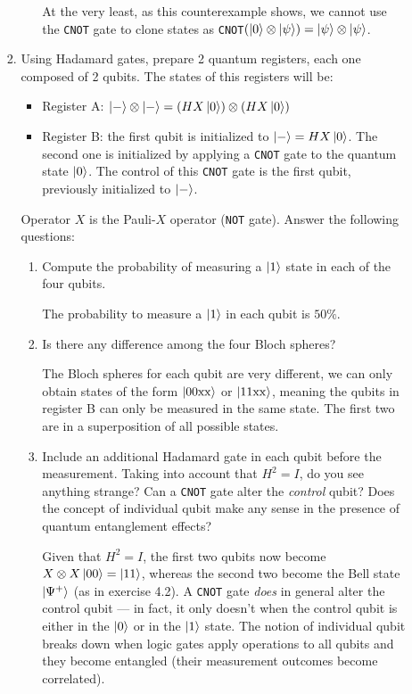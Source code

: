 \documentclass[11pt]{article}
\begin{document}
\begin{enumerate}[label*=\arabic*.]
\begin{enumerate}[label*=\arabic*.]
\begin{enumerate}[label*=\arabic*.]
\begin{enumerate}[label=(\alph*)]
At the very least, as this counterexample shows, we cannot use the \texttt{CNOT} gate to clone states as \texttt{CNOT}$(\ket{0}\otimes\ket{\psi})=\ket{\psi}\otimes\ket{\psi}$. 

    \end{enumerate}
    \item Using Hadamard gates, prepare 2 quantum registers, each one composed of 2 qubits. The states of
this registers will be:
\begin{itemize}
    \item Register A: $\ket{-}\otimes\ket{-}=(HX\ket{0})\otimes (HX\ket{0})$
    \item  Register B: the first qubit is initialized to $\ket{-}=HX\ket{0}$. The second one is initialized by applying a \texttt{CNOT} gate to the quantum state $\ket{0}$. The control of this \texttt{CNOT} gate is the first qubit, previously initialized to $\ket{-}$.
\end{itemize}
Operator $X$ is the Pauli-$X$ operator (\texttt{NOT} gate). Answer the following questions:
\begin{enumerate}[label=(\alph*)]
 \item Compute the probability of measuring a $\ket{1}$ state in each of the four qubits.

The probability to measure a $\ket{1}$ in each qubit is $50\%$.
 
 \item Is there any difference among the four Bloch spheres?

The Bloch spheres for each qubit are very different, we can only obtain states of the form $\ket{00\mathrm{xx}}$ or $\ket{11\mathrm{xx}}$, meaning the qubits in register B can only be measured in the same state. The first two are in a superposition of all possible states.
 
 \item Include an additional Hadamard gate in each qubit before the measurement. Taking into
account that $H^2 = I$, do you see anything strange? Can a \texttt{CNOT} gate alter the \textit{control} qubit?
Does the concept of individual qubit make any sense in the presence of quantum entanglement
effects?

Given that $H^2=I$, the first two qubits now become $X\otimes X\ket{00}=\ket{11}$, whereas the second two become the Bell state $\ket{\Psi^+}$ (as in exercise 4.2). A \texttt{CNOT} gate \textit{does} in general alter the control qubit --- in fact, it only doesn't when the control qubit is either in the $\ket{0}$ or in the $\ket{1}$ state. The notion of individual qubit breaks down when logic gates apply operations to all qubits and they become entangled (their measurement outcomes become correlated).


\end{enumerate}
\end{enumerate}
\end{enumerate}
\end{enumerate}
\end{document}
